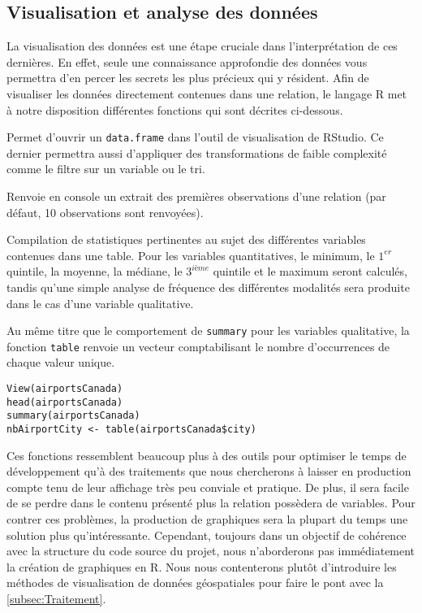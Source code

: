 \subsection{Visualisation et analyse des données}
\label{subsec:Visualisation}

La visualisation des données est une étape cruciale dans l’interprétation de ces dernières. En effet, seule une connaissance approfondie des données vous permettra d'en percer les secrets les plus précieux qui y résident. Afin de visualiser les données directement contenues dans une relation, le langage R met à notre disposition différentes fonctions qui sont décrites ci-dessous. 

\begin{description}[style=multiline,leftmargin=2cm]
		\item[\texttt{View}] Permet d'ouvrir un \texttt{data.frame} dans l'outil de visualisation de RStudio. Ce dernier permettra aussi d'appliquer des transformations de faible complexité comme le filtre sur un variable ou le tri. \cite{Rfunction:View}
		\item[\texttt{head}] Renvoie en console un extrait des premières observations d'une relation (par défaut, 10 observations sont renvoyées). \cite{Rfunction:head}
		\item[\texttt{summary}] Compilation de statistiques pertinentes au sujet des différentes variables contenues dans une table. Pour les variables quantitatives, le minimum, le $1^{er}$ quintile, la moyenne, la médiane, le $3^{ième}$ quintile et le maximum seront calculés, tandis qu'une simple analyse de fréquence des différentes modalités sera produite dans le cas d'une variable qualitative.
		\item[\texttt{table}] Au même titre que le comportement de \texttt{summary} pour les variables qualitative, la fonction \texttt{table} renvoie un vecteur comptabilisant le nombre d'occurrences de chaque valeur unique. \cite{Rfunction:table}
\end{description}

\begin{lstlisting}[caption = Fonctions de visualisation de données,label=src:DataVisual]
View(airportsCanada)
head(airportsCanada)
summary(airportsCanada)
nbAirportCity <- table(airportsCanada$city) 
\end{lstlisting}

\vspace{\baselineskip}
Ces fonctions ressemblent beaucoup plus à des outils pour optimiser le temps de développement qu'à des traitements que nous chercherons à laisser en production compte tenu de leur affichage très peu conviale et pratique. De plus, il sera facile de se perdre dans le contenu présenté plus la relation possèdera de variables. Pour contrer ces problèmes, la production de graphiques sera la plupart du temps une solution plus qu'intéressante. Cependant, toujours dans un objectif de cohérence avec la structure du code source du projet, nous n'aborderons pas immédiatement la création de graphiques en R. Nous nous contenterons plutôt d'introduire les méthodes de visualisation de données géospatiales pour faire le pont avec la \autoref{subsec:Traitement}.\\

